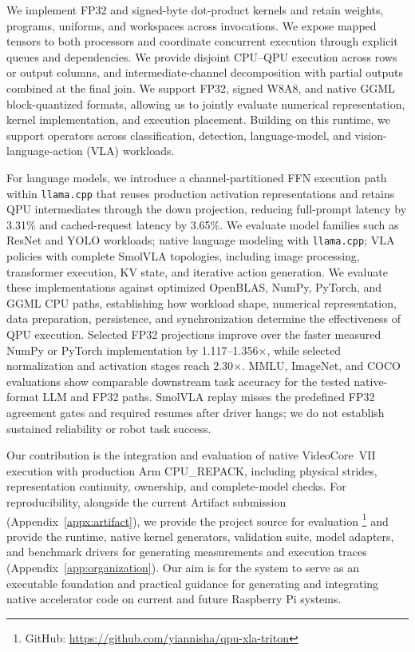 \documentclass[sigplan,screen,review]{acmart}
\begin{document}
We implement FP32 and signed-byte dot-product kernels and retain weights, programs, uniforms, and workspaces across invocations. We expose mapped tensors to both processors and coordinate concurrent execution through explicit queues and dependencies. We provide disjoint CPU--QPU execution across rows or output columns, and intermediate-channel decomposition with partial outputs combined at the final join. We support FP32, signed W8A8, and native GGML block-quantized formats, allowing us to jointly evaluate numerical representation, kernel implementation, and execution placement. 
Building on this runtime, we support operators across classification, detection, language-model, and vision-language-action (VLA) workloads. 

For language models, we introduce a channel-partitioned FFN execution path within \texttt{llama.cpp} that reuses production activation representations and retains QPU intermediates through the down projection, reducing full-prompt latency by 3.31\% and cached-request latency by 3.65\%. We evaluate model families such as ResNet and YOLO workloads; native language modeling with \texttt{llama.cpp}; VLA policies with complete SmolVLA topologies, including image processing, transformer execution, KV state, and iterative action generation. We evaluate these implementations against optimized OpenBLAS, NumPy, PyTorch, and GGML CPU paths, establishing how workload shape, numerical representation, data preparation, persistence, and synchronization determine the effectiveness of QPU execution. Selected FP32 projections improve over the faster measured NumPy or PyTorch implementation by 1.117--1.356$\times$, while selected normalization and activation stages reach 2.30$\times$. MMLU, ImageNet, and COCO evaluations show comparable downstream task accuracy for the tested native-format LLM and FP32 paths. SmolVLA replay misses the predefined FP32 agreement gates and required resumes after driver hangs; we do not establish sustained reliability or robot task success.

Our contribution is the integration and evaluation of native VideoCore~VII execution with production Arm CPU\_REPACK, including physical strides, representation continuity, ownership, and complete-model checks. For reproducibility, alongside the current Artifact submission (Appendix~\ref{appx:artifact}), we provide the project source for evaluation \footnote{GitHub: \url{https://github.com/yiannisha/qpu-xla-triton}} and provide the runtime, native kernel generators, validation suite, model adapters, and benchmark drivers for generating measurements and execution traces (Appendix~\ref{app:organization}). Our aim is for the system to serve as an executable foundation and practical guidance for generating and integrating native accelerator code on current and future Raspberry Pi systems. 
\end{document}
